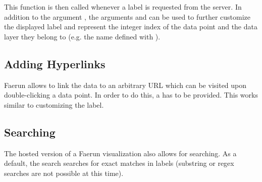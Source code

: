\documentclass[letterpaper,10pt,english]{sphinxmanual}
\begin{document}
This function is then called whenever a label is requested from the server. In addition to the argument , the arguments  and  can be used to further customize the displayed label and represent the integer index of the data point and the data layer they belong to (e.g. the name defined with ).

\noindent{}


\subsection{Adding Hyperlinks}
\label{\detokenize{host:adding-hyperlinks}}
Faerun allows to link the data to an arbitrary URL which can be visited upon double-clicking a data point. In order to do this, a  has to be provided. This works similar to customizing the label.

\begin{sphinxVerbatim}[commandchars=\\\{\}]
   
     

 
      
\end{sphinxVerbatim}


\subsection{Searching}
\label{\detokenize{host:searching}}
The hosted version of a Faerun visualization also allows for searching. As a default, the search searches for exact matches in labels (substring or regex searches are not possible at this time).

\noindent{}
\end{document}
